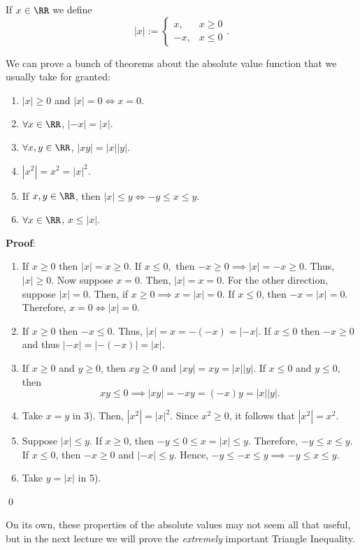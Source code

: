 \begin{definition}
If $x\in \RR$ we define
\[
|x| := \begin{cases}
x, &x\geq 0 \\
-x, &x\leq 0
\end{cases}.
\]
\end{definition}
\begin{theorem}
We can prove a bunch of theorems about the absolute value function that we usually take for granted:
\begin{enumerate}[label = \arabic*)]
    \item $|x|\geq 0$ and $|x| = 0 \iff x = 0$.
    \item $\forall x\in \RR$, $|-x| = |x|$.
    \item $\forall x,y\in \RR$, $|xy| = |x||y|$.
    \item $|x^2| = x^2 = |x|^2$.
    \item If $x,y\in \RR$, then $|x|\leq y \iff -y\leq x \leq y$.
    \item $\forall x\in \RR$, $x\leq |x|$.
\end{enumerate}
\end{theorem}
\textbf{Proof}: 
\begin{enumerate}[label = \arabic*)]
    \item If $x\geq 0$ then $|x| = x \geq 0$. If $x\leq 0,$ then $-x\geq 0 \implies |x| = -x\geq 0$. Thus, $|x|\geq 0$. Now suppose $x = 0$. Then, $|x| = x = 0$. For the other direction, suppose $|x| = 0$. Then, if $x\geq 0\implies x = |x| = 0$. If $x\leq 0$, then $-x = |x| = 0$. Therefore, $x=0\iff |x| = 0$.
    
    \item If $x\geq 0$ then $-x \leq 0$. Thus, $|x| = x = -(-x) = |-x|$. If $x\leq 0$ then $-x\geq 0$ and thus $|-x| = |-(-x)| = |x|$.
    \item If $x\geq 0$ and $y\geq 0$, then $xy \geq 0$ and $|xy| = xy = |x||y|$. If $x\leq 0$ and $y\leq 0$, then \[xy\leq 0 \implies |xy| = -xy = (-x)y = |x||y|.\]
    
    \item Take $x=y$ in 3). Then, $|x^2| = |x|^2$. Since $x^2 \geq 0$, it follows that $|x^2| = x^2$.
    
    \item Suppose $|x|\leq y$. If $x\geq 0$, then $-y\leq 0\leq x = |x| \leq y$. Therefore, $-y\leq x \leq y$. If $x\leq 0$, then $-x\geq 0$ and $|-x|\leq y$. Hence, $-y \leq -x\leq y \implies -y\leq x \leq y$.
    
    \item Take $y = |x|$ in 5).
\end{enumerate}
\qed 

On its own, these properties of the absolute values may not seem all that useful, but in the next lecture we will prove the \textit{extremely} important Triangle Inequality.